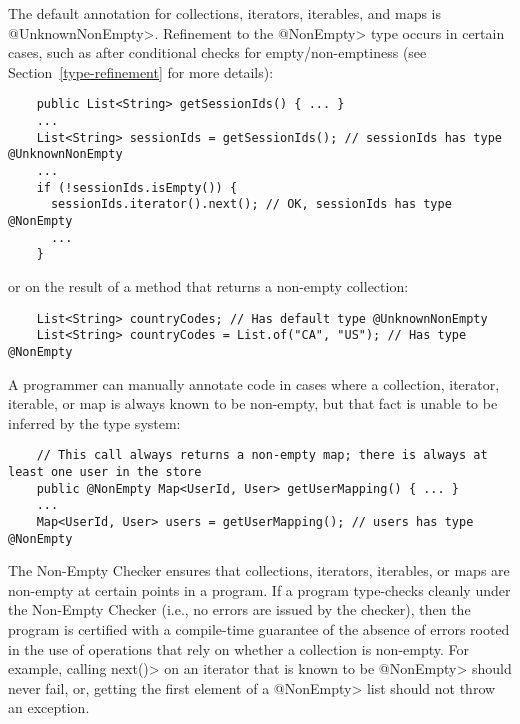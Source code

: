 
The default annotation for collections, iterators, iterables, and maps is
\<@UnknownNonEmpty>.
Refinement to the \<@NonEmpty> type occurs in certain cases, such as after
conditional checks for empty/non-emptiness (see Section~\ref{type-refinement} for
more details):

\begin{Verbatim}
    public List<String> getSessionIds() { ... }
    ...
    List<String> sessionIds = getSessionIds(); // sessionIds has type @UnknownNonEmpty
    ...
    if (!sessionIds.isEmpty()) {
      sessionIds.iterator().next(); // OK, sessionIds has type @NonEmpty
      ...
    }
\end{Verbatim}

\noindent
or on the result of a method that returns a non-empty collection:

\begin{Verbatim}
    List<String> countryCodes; // Has default type @UnknownNonEmpty
    List<String> countryCodes = List.of("CA", "US"); // Has type @NonEmpty
\end{Verbatim}

A programmer can manually annotate code in cases where a collection,
iterator, iterable, or map is always known to be non-empty, but that fact is
unable to be inferred by the type system:

\begin{Verbatim}
    // This call always returns a non-empty map; there is always at least one user in the store
    public @NonEmpty Map<UserId, User> getUserMapping() { ... }
    ...
    Map<UserId, User> users = getUserMapping(); // users has type @NonEmpty
\end{Verbatim}


The Non-Empty Checker ensures that collections, iterators, iterables, or maps
are non-empty at certain points in a program.
If a program type-checks cleanly under the Non-Empty Checker (i.e., no errors
are issued by the checker), then the program is certified with a compile-time
guarantee of the absence of errors rooted in the use of operations that
rely on whether a collection is non-empty.
For example, calling \<next()> on an iterator that is known to be \<@NonEmpty>
should never fail, or, getting the first element of a \<@NonEmpty> list should
not throw an exception.

